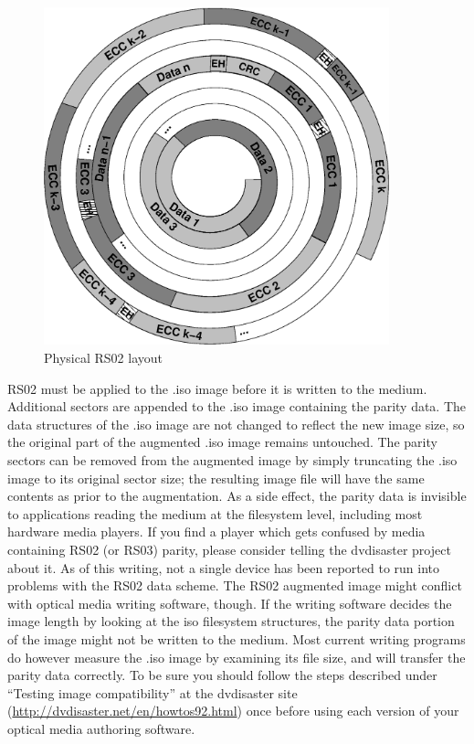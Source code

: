 \begin{figure}
 \begin{center}
 \includegraphics[width=10cm]{spiral-rs02.eps}
 \caption{Physical RS02 layout}
 \label{layout-phy-two}
 \end{center}
\end{figure}

RS02 must be applied to the .iso image before it is written to
the medium. Additional sectors are appended to the .iso image 
containing the parity data. The data structures of the .iso image
are not changed to reflect the new image size, so the original
part of the augmented .iso image remains untouched. The parity
sectors can be removed from the augmented image by simply 
truncating the .iso image to its original sector size; the resulting
image file will have the same contents as prior to the augmentation.
As a side effect, the parity data is invisible to applications reading
the medium at the filesystem level, including most hardware media
players. If you find a player which gets confused by media containing
RS02 (or RS03) parity, please consider telling the dvdisaster project about it. As of this writing,
not a single device has been reported to run into problems with
the RS02 data scheme. The RS02 augmented image might conflict with
optical media writing software, though. If the writing software
decides the image length by looking at the iso filesystem structures,
the parity data portion of the image might not be written to the medium.
Most current writing programs do however measure the .iso image by examining
its file size, and will transfer the parity data correctly. To be sure you
should follow the steps described under ``Testing image compatibility''
at the dvdisaster site (\url{http://dvdisaster.net/en/howtos92.html}) once
before using each version of your optical media authoring software.

